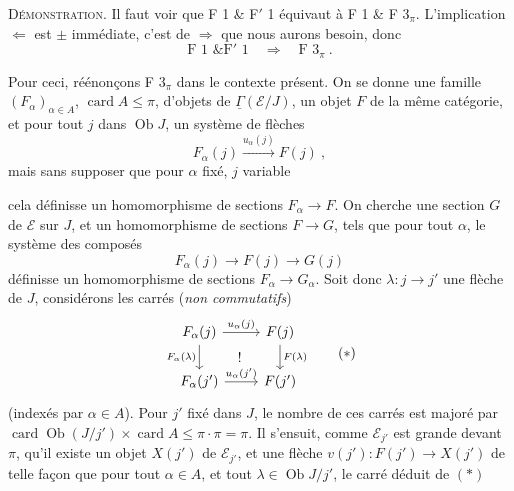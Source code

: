 \documentclass[11pt]{article}
\newcommand{\printedpage}[1]{\marginpar{\footnotesize p.~#1}}
\newcommand{\msp}[1]{\marginpar{\footnotesize [#1]}}
\newcommand{\Ob}{\operatorname{Ob}}
\newcommand{\card}{\operatorname{card}}
\newcommand{\uGamma}{\underline{\Gamma}}
\begin{document}
\textsc{Démonstration}. Il faut voir que F 1 \& F$'$ 1 équivaut à F 1 \& F $3_\pi$. L'implication $\Longleftarrow$ est $\pm$ immédiate, c'est de $\Longrightarrow$ que nous aurons besoin, donc
\[
\text{F 1 \& F}'\text{ 1} \quad\Longrightarrow\quad \text{F } 3_\pi\ .
\]

\printedpage{95}
Pour ceci, réénonçons F $3_\pi$ dans le contexte présent. On se donne une famille $(F_\alpha)_{\alpha\in A}$, $\card A\leqslant\pi$, d'objets de $\uGamma(\mathcal{E}/J)$, un objet $F$ de la même catégorie, et pour tout $j$ dans $\Ob J$, un système de flèches
\[
F_\alpha(j) \xrightarrow{u_\alpha(j)} F(j)\ ,
\]
mais sans supposer que pour $\alpha$ fixé, $j$ variable

\msp{252}
cela définisse un homomorphisme de sections $F_\alpha\longrightarrow F$. On cherche une section $G$ de $\mathcal{E}$ sur $J$, et un homomorphisme de sections $F\longrightarrow G$, tels que pour tout $\alpha$, le système des composés
\[
F_\alpha(j) \longrightarrow F(j) \longrightarrow G(j)
\]
définisse un homomorphisme de sections $F_\alpha\longrightarrow G_\alpha$. Soit donc $\lambda : j\longrightarrow j'$ une flèche de $J$, considérons les carrés (\textit{non commutatifs}) %
\[
\begin{tikzcd}
F_\alpha(j) \arrow[r,"u_\alpha(j)"] \arrow[d,"F_\alpha(\lambda)"'] \arrow[dr,phantom,"!"] & F(j) \arrow[d,"F(\lambda)"] \\
F_\alpha(j') \arrow[r,"u_\alpha(j')"] & F(j')
\end{tikzcd}
\tag*{$(*)$}
\]
(indexés par $\alpha\in A$). Pour $j'$ fixé dans $J$, le nombre de ces carrés est majoré par $\card\Ob(J/j')\times\card A\leqslant\pi\cdot\pi=\pi$. Il s'ensuit, comme $\mathcal{E}_{j'}$ est grande devant $\pi$, qu'il existe un objet $X(j')$ de $\mathcal{E}_{j'}$, et une flèche $v(j') : F(j')\longrightarrow X(j')$ de telle façon que pour tout $\alpha\in A$, et tout $\lambda\in\Ob J/j'$, le carré déduit de $(*)$
\end{document}
